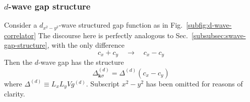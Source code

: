 \subsubsection{$d$-wave gap structure}

Consider a $d_{x^2 - y^2}$-wave structured gap function as in Fig.~\ref{subfig:d-wave-correlator} The discourse here is perfectly analogous to Sec.~\ref{subsubsec:swave-gap-structure}, with the only difference
\[
	c_x + c_y
	\quad\to\quad
	c_x - c_y
\]
Then the $d$-wave gap has the structure
\begin{equation}\label{eq:dwave-gap}
	\Delta_{\mathbf{k}\sigma}^{(d)} = \Delta^{(d)} (c_x - c_y)
\end{equation}
where $\Delta^{(d)} \equiv L_x L_y V g^{(d)}$. Subscript $x^2 - y^2$ has been omitted for reasons of clarity.
